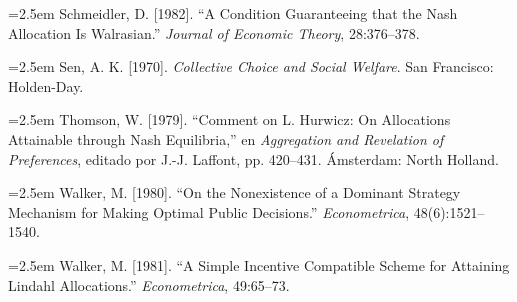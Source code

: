 \documentclass[12pt, letterpaper]{article}
\newcommand{\bibentry}[1]{\noindent\hangindent=2.5em\hangafter=1 \small #1 \par\vspace{0.75em}}
\begin{document}
\bibentry{Schmeidler, D. [1982]. ``A Condition Guaranteeing that the Nash Allocation Is Walrasian.'' \textit{Journal of Economic Theory}, 28:376--378.}


\bibentry{Sen, A. K. [1970]. \textit{Collective Choice and Social Welfare}. San Francisco: Holden-Day.}

\bibentry{Thomson, W. [1979]. ``Comment on L. Hurwicz: On Allocations Attainable through Nash Equilibria,'' en \textit{Aggregation and Revelation of Preferences}, editado por J.-J. Laffont, pp. 420--431. Ámsterdam: North Holland.}

\bibentry{Walker, M. [1980]. ``On the Nonexistence of a Dominant Strategy Mechanism for Making Optimal Public Decisions.'' \textit{Econometrica}, 48(6):1521--1540.}

\bibentry{Walker, M. [1981]. ``A Simple Incentive Compatible Scheme for Attaining Lindahl Allocations.'' \textit{Econometrica}, 49:65--73.}
\end{document}
